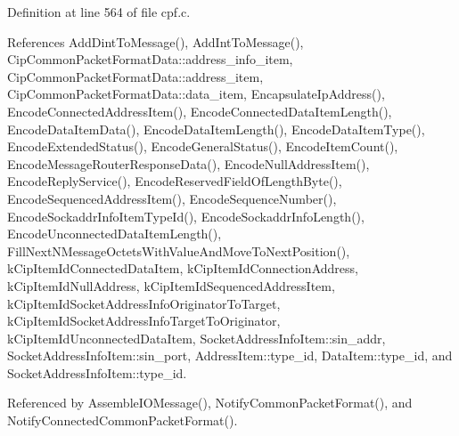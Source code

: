 \-Definition at line 564 of file cpf.\-c.



\-References \-Add\-Dint\-To\-Message(), \-Add\-Int\-To\-Message(), \-Cip\-Common\-Packet\-Format\-Data\-::address\-\_\-info\-\_\-item, \-Cip\-Common\-Packet\-Format\-Data\-::address\-\_\-item, \-Cip\-Common\-Packet\-Format\-Data\-::data\-\_\-item, \-Encapsulate\-Ip\-Address(), \-Encode\-Connected\-Address\-Item(), \-Encode\-Connected\-Data\-Item\-Length(), \-Encode\-Data\-Item\-Data(), \-Encode\-Data\-Item\-Length(), \-Encode\-Data\-Item\-Type(), \-Encode\-Extended\-Status(), \-Encode\-General\-Status(), \-Encode\-Item\-Count(), \-Encode\-Message\-Router\-Response\-Data(), \-Encode\-Null\-Address\-Item(), \-Encode\-Reply\-Service(), \-Encode\-Reserved\-Field\-Of\-Length\-Byte(), \-Encode\-Sequenced\-Address\-Item(), \-Encode\-Sequence\-Number(), \-Encode\-Sockaddr\-Info\-Item\-Type\-Id(), \-Encode\-Sockaddr\-Info\-Length(), \-Encode\-Unconnected\-Data\-Item\-Length(), \-Fill\-Next\-N\-Message\-Octets\-With\-Value\-And\-Move\-To\-Next\-Position(), k\-Cip\-Item\-Id\-Connected\-Data\-Item, k\-Cip\-Item\-Id\-Connection\-Address, k\-Cip\-Item\-Id\-Null\-Address, k\-Cip\-Item\-Id\-Sequenced\-Address\-Item, k\-Cip\-Item\-Id\-Socket\-Address\-Info\-Originator\-To\-Target, k\-Cip\-Item\-Id\-Socket\-Address\-Info\-Target\-To\-Originator, k\-Cip\-Item\-Id\-Unconnected\-Data\-Item, \-Socket\-Address\-Info\-Item\-::sin\-\_\-addr, \-Socket\-Address\-Info\-Item\-::sin\-\_\-port, \-Address\-Item\-::type\-\_\-id, \-Data\-Item\-::type\-\_\-id, and \-Socket\-Address\-Info\-Item\-::type\-\_\-id.



\-Referenced by \-Assemble\-I\-O\-Message(), \-Notify\-Common\-Packet\-Format(), and \-Notify\-Connected\-Common\-Packet\-Format().




